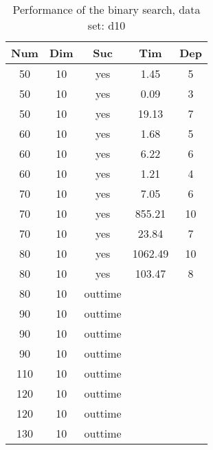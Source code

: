 \begin{table}[!htb]
  \centering
  \begin{tabular}[center]{|c|c|c|c|c|}
    \hline
    Num & Dim & Suc & Tim & Dep \\
    \hline
    50 & 10 & yes & 1.45 & 5 \\
    50 & 10 & yes & 0.09 & 3 \\
    50 & 10 & yes & 19.13 & 7 \\
    60 & 10 & yes & 1.68 & 5 \\
    60 & 10 & yes & 6.22 & 6 \\
    60 & 10 & yes & 1.21 & 4 \\
    70 & 10 & yes & 7.05 & 6 \\
    70 & 10 & yes & 855.21 & 10 \\
    70 & 10 & yes & 23.84 & 7 \\
    80 & 10 & yes & 1062.49 & 10 \\
    80 & 10 & yes & 103.47 & 8 \\
    80 & 10 & outtime &&\\
    90 & 10 & outtime &&\\
    90 & 10 & outtime &&\\
    90 & 10 & outtime &&\\
    110 & 10 & outtime &&\\
    120 & 10 & outtime &&\\
    120 & 10 & outtime &&\\
    130 & 10 & outtime &&\\
    \hline
  \end{tabular}
  \caption{Performance of the binary search, data set: d10}
  \label{tab:test.bin-d10}
\end{table}

